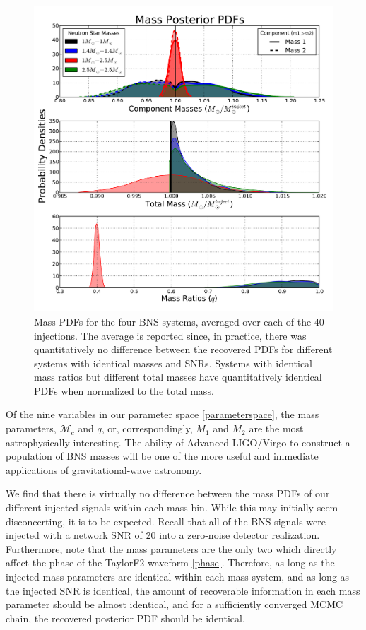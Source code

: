 \documentclass[11pt,a4paper]{emulateapj} 
\newcommand{\chmass}{\mathcal{M}_c}
\begin{document}
\begin{figure}[ht!]
  \centering \includegraphics[trim=2cm 0cm 2cm 0cm,
    clip=false,scale=0.7]{newMasses.pdf}
 \caption{Mass PDFs for the four BNS systems, averaged over each of
   the 40 injections.  The average is reported since, in practice,
   there was quantitatively no difference between the recovered PDFs
   for different systems with identical masses and SNRs.  Systems with
   identical mass ratios but different total masses have
   quantitatively identical PDFs when normalized to the total
   mass.}
  \label{metaMassPDFs}
\end{figure}

Of the nine variables in our parameter space \eqref{parameterspace},
the mass parameters, $\chmass$ and $q$, or, correspondingly, $M_1$ and
$M_2$ are the most astrophysically interesting.  The ability of
Advanced LIGO/Virgo to construct a population of BNS masses will be
one of the more useful and immediate applications of gravitational-wave astronomy.

We find that there is virtually no difference between the mass PDFs of
our different injected signals within each mass bin.  While this may
initially seem disconcerting, it is to be expected.  Recall that all
of the BNS signals were injected with a network SNR of 20 into a
zero-noise detector realization.  Furthermore, note that the mass
parameters are the only two which directly affect the phase of the
TaylorF2 waveform \eqref{phase}.  Therefore, as long as the injected
mass parameters are identical within each mass system, and as long as
the injected SNR is identical, the amount of recoverable information
in each mass parameter should be almost identical, and for a
sufficiently converged MCMC chain, the recovered posterior PDF should
be identical.
\end{document}
